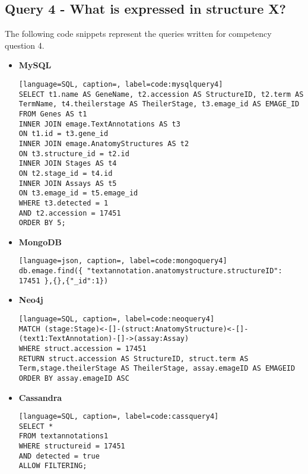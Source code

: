 \subsection*{Query 4 - What is expressed in structure X?}\label{query4}
The following code snippets represent the queries written for competency question 4.
\begin{itemize}
\item \textbf{MySQL}
\begin{lstlisting}[language=SQL, caption=, label=code:mysqlquery4]
SELECT t1.name AS GeneName, t2.accession AS StructureID, t2.term AS TermName, t4.theilerstage AS TheilerStage, t3.emage_id AS EMAGE_ID
FROM Genes AS t1
INNER JOIN emage.TextAnnotations AS t3
ON t1.id = t3.gene_id
INNER JOIN emage.AnatomyStructures AS t2
ON t3.structure_id = t2.id
INNER JOIN Stages AS t4
ON t2.stage_id = t4.id
INNER JOIN Assays AS t5
ON t3.emage_id = t5.emage_id
WHERE t3.detected = 1
AND t2.accession = 17451
ORDER BY 5;
\end{lstlisting}
\item \textbf{MongoDB}
\begin{lstlisting}[language=json, caption=, label=code:mongoquery4]
db.emage.find({ "textannotation.anatomystructure.structureID": 17451 },{},{"_id":1})
\end{lstlisting}
\item \textbf{Neo4j}
\begin{lstlisting}[language=SQL, caption=, label=code:neoquery4]
MATCH (stage:Stage)<-[]-(struct:AnatomyStructure)<-[]-(text1:TextAnnotation)-[]->(assay:Assay)
WHERE struct.accession = 17451
RETURN struct.accession AS StructureID, struct.term AS Term,stage.theilerStage AS TheilerStage, assay.emageID AS EMAGEID
ORDER BY assay.emageID ASC
\end{lstlisting}
\item \textbf{Cassandra}
\begin{lstlisting}[language=SQL, caption=, label=code:cassquery4]
SELECT *
FROM textannotations1
WHERE structureid = 17451
AND detected = true
ALLOW FILTERING;
\end{lstlisting}
\end{itemize}
